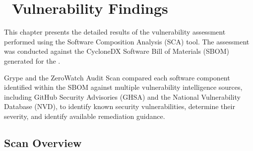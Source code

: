 
\chapter[Vulnerability Findings]{\IconWarning\ Vulnerability Findings}

\newcommand{\CriticalBadge}{\fboxsep=3pt\fboxrule=0.6pt\fcolorbox{ZWRed}{ZWRed!10}{\small\bfseries\color{ZWRed}CRITICAL}}
\newcommand{\HighBadge}{\fboxsep=3pt\fboxrule=0.6pt\fcolorbox{ZWRed}{ZWRed!10}{\small\bfseries\color{ZWRed}HIGH}}
\newcommand{\MediumBadge}{\fboxsep=3pt\fboxrule=0.6pt\fcolorbox{ZWOrange}{ZWOrange!10}{\small\bfseries\color{ZWOrange}MEDIUM}}
\newcommand{\LowBadge}{\fboxsep=3pt\fboxrule=0.6pt\fcolorbox{ZWTeal}{ZWTeal!10}{\small\bfseries\color{ZWTeal}LOW}}
\newcommand{\NegligibleBadge}{\fboxsep=3pt\fboxrule=0.6pt\fcolorbox{gray}{gray!10}{\small\bfseries\color{gray}NEGLIGIBLE}}

This chapter presents the detailed results of the vulnerability assessment performed using the \textbf{\VulScanner} Software Composition Analysis (SCA) tool. The assessment was conducted against the CycloneDX Software Bill of Materials (SBOM) generated for the \textbf{\ProjectName}.

Grype and the ZeroWatch Audit Scan compared each software component identified within the SBOM against multiple vulnerability intelligence sources, including GitHub Security Advisories (GHSA) and the National Vulnerability Database (NVD), to identify known security vulnerabilities, determine their severity, and identify available remediation guidance.

\vspace{0.4cm}


\section{Scan Overview}

